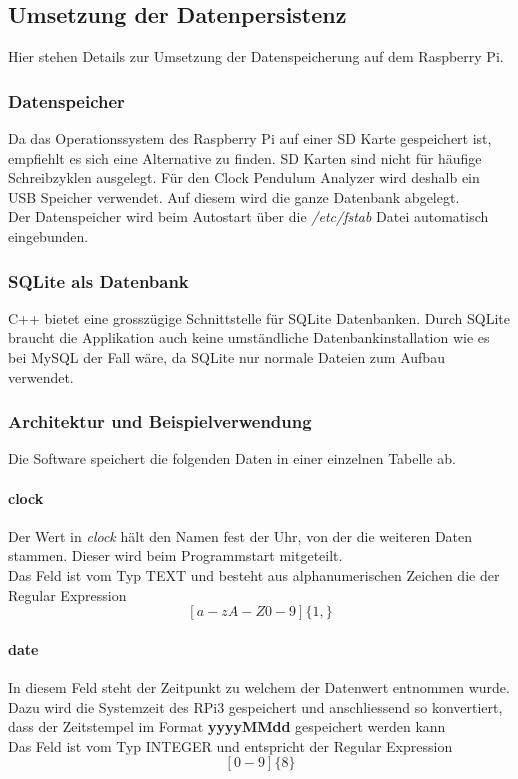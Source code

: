 \subsection{Umsetzung der Datenpersistenz}
    Hier stehen Details zur Umsetzung der Datenspeicherung auf dem Raspberry Pi.
    \subsubsection{Datenspeicher}
    Da das Operationssystem des Raspberry Pi auf einer SD Karte gespeichert ist, empfiehlt es sich eine Alternative zu finden. SD Karten sind nicht für häufige Schreibzyklen ausgelegt. Für den Clock Pendulum Analyzer wird deshalb ein USB Speicher verwendet. Auf diesem wird die ganze Datenbank abgelegt.\\
    Der Datenspeicher wird beim Autostart über die \textit{/etc/fstab} Datei automatisch eingebunden.
    
    \subsubsection{SQLite als Datenbank}
    C++ bietet eine grosszügige Schnittstelle für SQLite Datenbanken. Durch SQLite braucht die Applikation auch keine umständliche Datenbankinstallation wie es bei MySQL der Fall wäre, da SQLite nur normale Dateien zum Aufbau verwendet.
    
    \subsubsection{Architektur und Beispielverwendung}
    Die Software speichert die folgenden Daten in einer einzelnen Tabelle ab.
    \paragraph{clock}
    Der Wert in \textit{clock} hält den Namen fest der Uhr, von der die weiteren Daten stammen. Dieser wird beim Programmstart mitgeteilt.\\
    Das Feld ist vom Typ TEXT und besteht aus alphanumerischen Zeichen die der Regular Expression $$[a-zA-Z0-9]\{1,\}$$
    \paragraph{date}\label{sec:db_date}%
    In diesem Feld steht der Zeitpunkt zu welchem der Datenwert entnommen wurde. Dazu wird die Systemzeit des RPi3 gespeichert und anschliessend so konvertiert, dass der Zeitstempel im Format \textbf{yyyyMMdd} gespeichert werden kann\\
    Das Feld ist vom Typ INTEGER und entspricht der Regular Expression
    $$[0-9]\{8\}$$
